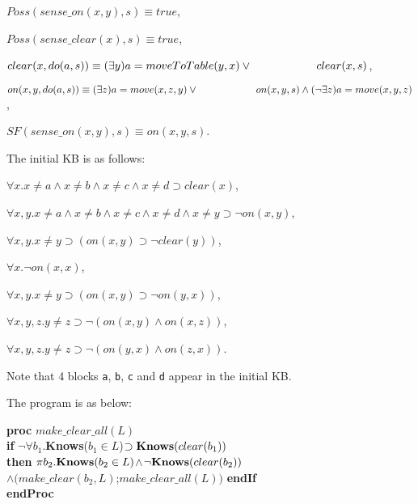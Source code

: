\documentclass[letterpaper]{article}
\newcommand{\Knows}{\mbox{\bf Knows}}
\begin{document}
\noindent $Poss(sense\_on(x, y), s) \equiv true$,

\noindent $Poss(sense\_clear(x), s) \equiv true$,

\noindent $clear(x,do(a,s))\equiv (\exists y)a=moveToTable(y,x)\vee\\
\hspace*{2cm} clear(x,s)$,

\noindent $on(x,y,do(a,s))\equiv (\exists z)a=move(x, z, y) \vee\\ \hspace*{2cm} on(x,y,s) \wedge (\neg\exists z)a = move(x, y, z)$,

\noindent $SF(sense\_on(x, y), s) \equiv on(x, y, s)$.

The initial KB is as follows:

\vspace*{.1cm}
\noindent $\forall x.x \neq a \wedge x \neq b \wedge x \neq c \wedge x \neq d \supset clear(x)$,

\noindent $\forall x,y.x \neq a \wedge x \neq b \wedge x \neq c \wedge x \neq d \wedge x \neq y \supset \neg on(x, y)$,

\noindent $\forall x, y. x \neq y \supset (on(x, y) \supset \neg clear(y))$,

\noindent $\forall x. \neg on(x, x)$,

\noindent $\forall x, y.x \neq y \supset (on(x, y) \supset \neg on(y, x))$,

\noindent $\forall x, y, z.y \neq z \supset \neg(on(x, y) \wedge on(x, z))$,

\noindent $\forall x, y, z.y \neq z \supset \neg(on(y, x) \wedge on(z, x))$.

\noindent Note that 4 blocks \verb"a", \verb"b", \verb"c" and \verb"d" appear in the initial KB.

The program is as below:
\vspace{.1cm}

\noindent\textbf{proc} $make\_clear\_all(L)$\\
\noindent\textbf{if} $\neg$$\forall b_1.$\Knows($b_1 \in L$)$\supset\Knows(clear(b_1))$\\
\textbf{then} $\pi b_2.\Knows(b_2 \in L)$$\wedge$$\neg\Knows(clear(b_2))$\\
\hspace*{1.2cm}$\wedge$$(make\_clear(b_2, L)$;$make\_clear\_all(L))$ \textbf{endIf}\\
\noindent\textbf{endProc}

\vspace{.1cm}
\end{document}

